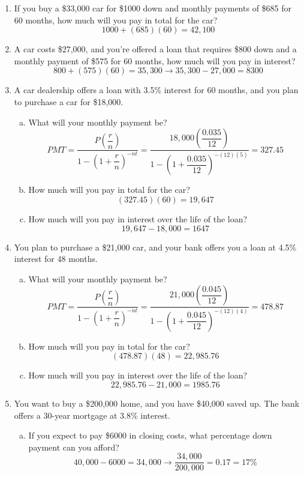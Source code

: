 \begin{enumerate}
\item If you buy a \$33,000 car for \$1000 down and monthly payments of \$685 for 60 months, how much will you pay in total for the car? 
\[1000 + (685)(60) = 42,100\]

\item A car costs \$27,000, and you're offered a loan that requires \$800 down and a monthly payment of \$575 for 60 months, how much will you pay in interest? 
\[800 + (575)(60) = 35,300 \longrightarrow 35,300 - 27,000 = 8300\]

\item A car dealership offers a loan with 3.5\% interest for 60 months, and you plan to purchase a car for \$18,000.
\begin{enumerate}[(a)]
\item What will your monthly payment be? 
\[PMT = \dfrac{P\left(\dfrac{r}{n}\right)}{1-\left(1+\dfrac{r}{n}\right)^{-nt}} = \dfrac{18,000\left(\dfrac{0.035}{12}\right)}{1-\left(1+\dfrac{0.035}{12}\right)^{-(12)(5)}} = 327.45\]

\item How much will you pay in total for the car? 
\[(327.45)(60) = 19,647\]

\item How much will you pay in interest over the life of the loan? 
\[19,647 - 18,000 = 1647\]
\end{enumerate}

\item You plan to purchase a \$21,000 car, and your bank offers you a loan at 4.5\% interest for 48 months.
\begin{enumerate}[(a)]
\item What will your monthly payment be? 
\[PMT = \dfrac{P\left(\dfrac{r}{n}\right)}{1-\left(1+\dfrac{r}{n}\right)^{-nt}} = \dfrac{21,000\left(\dfrac{0.045}{12}\right)}{1-\left(1+\dfrac{0.045}{12}\right)^{-(12)(4)}} = 478.87\]

\item How much will you pay in total for the car? 
\[(478.87)(48) = 22,985.76\]

\item How much will you pay in interest over the life of the loan? 
\[22,985.76 - 21,000 = 1985.76\]
\end{enumerate}

\item You want to buy a \$200,000 home, and you have \$40,000 saved up.  The bank offers a 30-year mortgage at 3.8\% interest.
\begin{enumerate}[(a)]
\item If you expect to pay \$6000 in closing costs, what percentage down payment can you afford? 
\[40,000 - 6000 = 34,000 \longrightarrow \dfrac{34,000}{200,000} = 0.17 = 17\%\]


\end{enumerate}
\end{enumerate}
